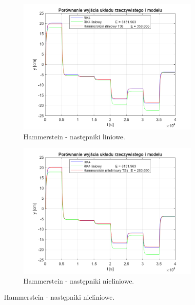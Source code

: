\begin{figure}[b!]
\centering
\begin{subfigure}[b]{0.49\paperwidth}
\centering
\includegraphics[width=\linewidth]{pictures/HammersteinLinearModel_1}
\caption{Hammerstein - następniki liniowe.}
\end{subfigure}
\hfill
\begin{subfigure}[b]{0.49\paperwidth}
\centering
\includegraphics[width=\linewidth]{pictures/HammersteinNonlinearModel_1}
\caption{Hammerstein -  następniki nieliniowe.}
\end{subfigure}
    
\vspace{0.5cm} %


\end{figure}
